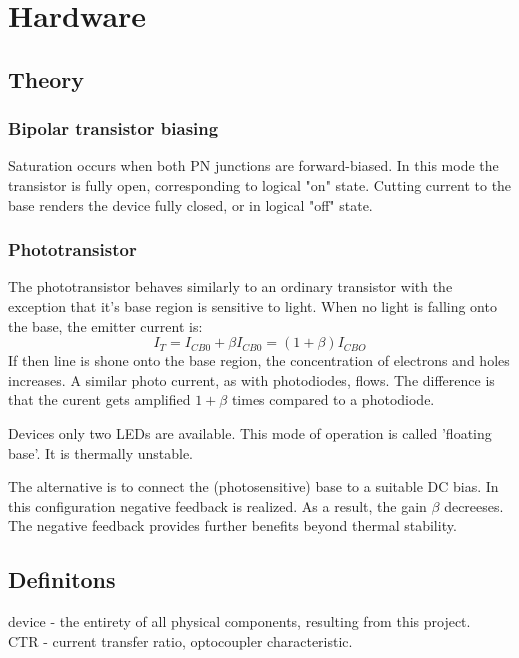 \section{Hardware}
\subsection{Theory}

\subsubsection{Bipolar transistor biasing}
Saturation occurs when both PN junctions are forward-biased.
In this mode the transistor is fully open, corresponding to logical "on" state.
Cutting current to the base renders the device fully closed, or in logical "off" state.

\subsubsection{Phototransistor}
The phototransistor behaves similarly to an ordinary transistor with the exception that it's base region is sensitive to light.
When no light is falling onto the base, the emitter current is:
\begin{equation}
    I_T = I_{CB0} + \beta I_{CB0} = (1 + \beta) I_{CBO}
\end{equation}
If then line is shone onto the base region, the concentration of electrons and holes increases.
A similar photo current, as with photodiodes, flows.
The difference is that the curent gets amplified $1+\beta$ times compared to a photodiode.
\par
Devices only two LEDs are available.
This mode of operation is called 'floating base'.
It is thermally unstable.
\par
The alternative is to connect the (photosensitive) base to a suitable DC bias.
In this configuration negative feedback is realized.
As a result, the gain $\beta$ decreeses.
The negative feedback provides further benefits beyond thermal stability.

\subsection{Definitons}
device - the entirety of all physical components, resulting from this project.  \\
CTR - current transfer ratio, optocoupler characteristic.

